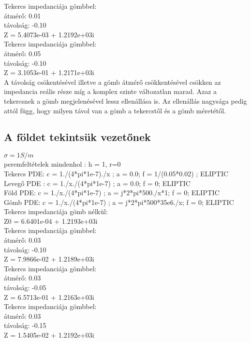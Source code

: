 Tekercs impedanciája gömbbel:\\
átmérő: 0.01 \\
távolság: -0.10 \\
Z = 5.4073e-03 + 1.2192e+03i \\

Tekercs impedanciája gömbbel:\\
átmérő: 0.05 \\
távolság: -0.10 \\
Z = 3.1053e-01 + 1.2171e+03i \\

A távolság csökentésével illetve a gömb átmérő csökkentésével csökken az impedancia reális
része míg a komplex szinte változatlan marad. Azaz a tekercsnek a gömb megjelenésével
lessz ellenállása is. Az ellenállás  nagysága pedig attól függ, hogy milyen távol van a gömb
a tekercstől és a gömb méretétől.


\subsection{A földet tekintsük vezetőnek}
$\sigma = 1 S/m$\\
peremfeltételek mindenhol : h = 1, r=0\\
Tekercs PDE: c = 1./(4*pi*1e-7)./x ; a = 0.0; f = 1/(0.05*0.02) ; ELIPTIC \\
Levegő PDE : c = 1./x./(4*pi*1e-7) ; a = 0.0; f = 0; ELIPTIC \\
Föld PDE:    c = 1./x./(4*pi*1e-7) ; a = j*2*pi*500./x*1; f = 0; ELIPTIC \\
Gömb PDE:    c = 1./x./(4*pi*1e-7) ; a = j*2*pi*500*35e6./x; f = 0; ELIPTIC \\

Tekercs impedanciája gömb nélkül:\\
Z0 = 6.6401e-04 + 1.2193e+03i\\

Tekercs impedanciája gömbbel:\\
átmérő: 0.03 \\
távolság: -0.10 \\
Z = 7.9866e-02 + 1.2189e+03i\\

Tekercs impedanciája gömbbel:\\
átmérő: 0.03 \\
távolság: -0.05 \\
Z = 6.5713e-01 + 1.2163e+03i\\

Tekercs impedanciája gömbbel:\\
átmérő: 0.03 \\
távolság: -0.15 \\
Z =  1.5405e-02 + 1.2192e+03i\\

